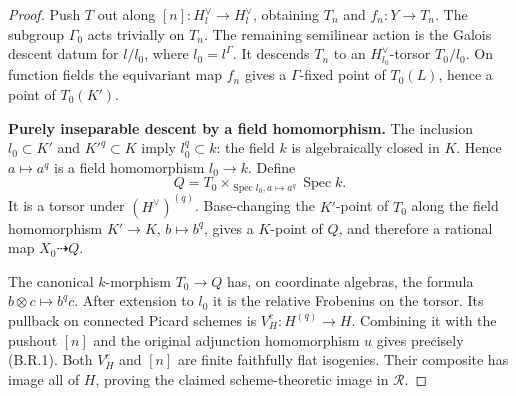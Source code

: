 \begin{proof}
Push $T$ out along $[n]:H_l^\vee\to H_l^\vee$, obtaining
$T_n$ and $f_n:Y\to T_n$.  The subgroup $\Gamma_0$ acts
trivially on $T_n$.  The remaining semilinear action is the
Galois descent datum for $l/l_0$, where $l_0=l^\Gamma$.
It descends $T_n$ to an $H^\vee_{l_0}$-torsor $T_0/l_0$.
On function fields the equivariant map $f_n$ gives a
$\Gamma$-fixed point of $T_0(L)$, hence a point of $T_0(K')$.

\par\smallskip\noindent\textbf{Purely inseparable descent by a field homomorphism.}\quad
The inclusion $l_0\subset K'$ and $K'^q\subset K$ imply
$l_0^q\subset k$: the field $k$ is algebraically closed in
$K$.  Hence $a\mapsto a^q$ is a field homomorphism
$l_0\to k$.  Define
\[
 Q=T_0\times_{\operatorname{Spec}l_0, a\mapsto a^q}
                   \operatorname{Spec}k.
\]
It is a torsor under $(H^\vee)^{(q)}$.
Base-changing the $K'$-point of $T_0$ along the field
homomorphism $K'\to K$, $b\mapsto b^q$, gives a $K$-point
of $Q$, and therefore a rational map $X_0\dashrightarrow Q$.

The canonical $k$-morphism $T_0\to Q$ has, on coordinate
algebras, the formula $b\otimes c\mapsto b^q c$.
After extension to $l_0$ it is the relative Frobenius on the
torsor.  Its pullback on connected Picard schemes is
$V_H^e:H^{(q)}\to H$.  Combining it with the pushout $[n]$
and the original adjunction homomorphism $u$ gives precisely
(B.R.1).  Both $V_H^e$ and $[n]$ are finite faithfully flat
isogenies.  Their composite has image all of $H$, proving
the claimed scheme-theoretic image in $\mathcal R$.
\end{proof}

